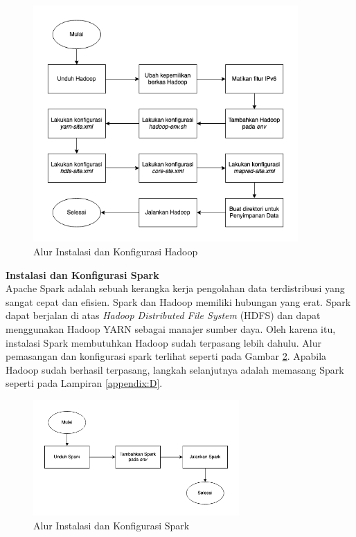 \begin{figure}[h!]
    \centering
    \includegraphics[width=0.9\textwidth]{figures/ch03/hadoop-flow.png}
    \caption{Alur Instalasi dan Konfigurasi Hadoop}
    \label{fig:hadoop-flow}
\end{figure}

\textbf{Instalasi dan Konfigurasi Spark}\\
Apache Spark adalah sebuah kerangka kerja pengolahan data terdistribusi yang sangat cepat dan efisien. Spark dan Hadoop memiliki hubungan yang erat. Spark dapat berjalan di atas \textit{Hadoop Distributed File System} (HDFS) dan dapat menggunakan Hadoop YARN sebagai manajer sumber daya. Oleh karena itu, instalasi Spark membutuhkan Hadoop sudah terpasang lebih dahulu. Alur pemasangan dan konfigurasi spark terlihat seperti pada Gambar \ref{fig:spark-flow}. Apabila Hadoop sudah berhasil terpasang, langkah selanjutnya adalah memasang Spark seperti pada Lampiran \ref{appendix:D}.\\

\begin{figure}[h]
    \centering
    \includegraphics[width=0.7\textwidth]{figures/ch03/spark-flow.png}
    \caption{Alur Instalasi dan Konfigurasi Spark}
    \label{fig:spark-flow}
\end{figure}


